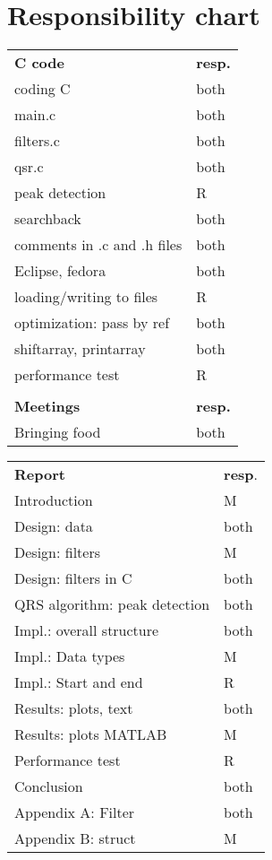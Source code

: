 \section*{Responsibility chart}
\begin{multicols}{2}

\begin{table}[H]
\centering
\begin{tabular}{ll}
\textbf{C code}         & \textbf{resp.} \\
coding C                & both       \\
main.c                  & both       \\
filters.c               & both       \\
qsr.c                   & both       \\
peak detection          & R          \\
searchback              & both       \\
comments in .c and .h files                                                    & both       \\
Eclipse, fedora         & both          \\
loading/writing to files & R          \\
optimization: pass by ref                                                      & both       \\
shiftarray, printarray  & both       \\
performance test        & R          \\
                        &           \\
\textbf{Meetings}       & \textbf{resp.}\\
Bringing food           & both  
\end{tabular}
\end{table}


\begin{table}[H]
\centering
\begin{tabular}{ll}
\textbf{Report}         & \textbf{resp}. \\
Introduction            & M     \\
Design: data            & both  \\
Design: filters         & M     \\
Design: filters in C    & both     \\
QRS algorithm: peak detection                                                  & both  \\
Impl.: overall structure & both  \\
Impl.: Data types       & M     \\
Impl.: Start and end    & R     \\
Results: plots, text    & both  \\
Results: plots MATLAB   & M     \\
Performance test        & R     \\
Conclusion              & both  \\
Appendix A: Filter      & both  \\
Appendix B: struct      & M    
\end{tabular}
\end{table}

\end{multicols}
